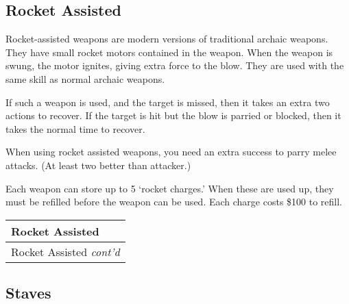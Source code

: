 \documentclass[twoside]{book}
\begin{document}
    

\subsection{Rocket Assisted}
    
    {  
      Rocket-assisted weapons are modern versions of
               traditional archaic weapons. They have small rocket motors
               contained in the weapon. When the weapon is swung, the
               motor ignites, giving extra force to the blow. They are
               used with the same skill as normal archaic weapons.
               
    }
  
    {  
      If such a weapon is used, and the target is missed,
               then it takes an extra two actions to recover. If the
               target is hit but the blow is parried or blocked, then it
               takes the normal time to recover. 
    }
  
    {  
      When using rocket assisted weapons, you need an
               extra success to parry melee attacks. (At least two better
               than attacker.) 
    }
  
    {  
      Each weapon can store up to 5 `rocket
               charges.' When these are used up, they must be
               refilled before the weapon can be used. Each charge costs
               \$100 to refill. 
    }
  
\begin{longtable}{p{1.25in}} 
  Rocket Assisted
  \\
  \hline
  \hline
  \endfirsthead
  Rocket Assisted \textit{cont'd}
        
  \\
  \hline
  \endhead
      
\end{longtable}
    
\begin{multicols}{2}
    
\end{multicols}
  
    

\subsection{Staves}
    
\end{document}
